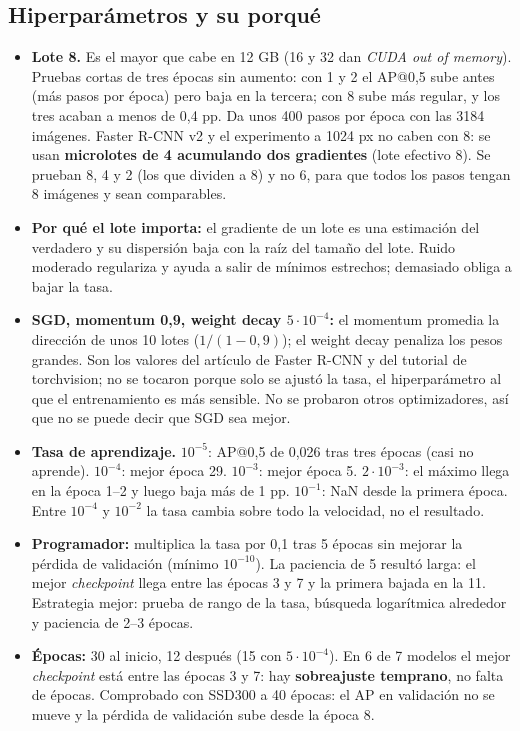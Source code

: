 \documentclass[11pt,a4paper]{article}
\begin{document}
\subsection{Hiperparámetros y su porqué}
\begin{itemize}
  \item \textbf{Lote 8.} Es el mayor que cabe en 12 GB (16 y 32 dan \emph{CUDA out of memory}). Pruebas cortas de tres épocas sin aumento: con 1 y 2 el AP@0,5 sube antes (más pasos por época) pero baja en la tercera; con 8 sube más regular, y los tres acaban a menos de 0,4 pp. Da unos 400 pasos por época con las 3184 imágenes. Faster R-CNN v2 y el experimento a 1024 px no caben con 8: se usan \textbf{microlotes de 4 acumulando dos gradientes} (lote efectivo 8). Se prueban 8, 4 y 2 (los que dividen a 8) y no 6, para que todos los pasos tengan 8 imágenes y sean comparables.
  \item \textbf{Por qué el lote importa:} el gradiente de un lote es una estimación del verdadero y su dispersión baja con la raíz del tamaño del lote. Ruido moderado regulariza y ayuda a salir de mínimos estrechos; demasiado obliga a bajar la tasa.
  \item \textbf{SGD, momentum 0,9, weight decay $5\cdot10^{-4}$:} el momentum promedia la dirección de unos 10 lotes ($1/(1-0{,}9)$); el weight decay penaliza los pesos grandes. Son los valores del artículo de Faster R-CNN y del tutorial de torchvision; no se tocaron porque solo se ajustó la tasa, el hiperparámetro al que el entrenamiento es más sensible. No se probaron otros optimizadores, así que no se puede decir que SGD sea mejor.
  \item \textbf{Tasa de aprendizaje.} $10^{-5}$: AP@0,5 de 0,026 tras tres épocas (casi no aprende). $10^{-4}$: mejor época 29. $10^{-3}$: mejor época 5. $2\cdot10^{-3}$: el máximo llega en la época 1--2 y luego baja más de 1 pp. $10^{-1}$: NaN desde la primera época. Entre $10^{-4}$ y $10^{-2}$ la tasa cambia sobre todo la velocidad, no el resultado.
  \item \textbf{Programador:} multiplica la tasa por 0,1 tras 5 épocas sin mejorar la pérdida de validación (mínimo $10^{-10}$). La paciencia de 5 resultó larga: el mejor \emph{checkpoint} llega entre las épocas 3 y 7 y la primera bajada en la 11. Estrategia mejor: prueba de rango de la tasa, búsqueda logarítmica alrededor y paciencia de 2--3 épocas.
  \item \textbf{Épocas:} 30 al inicio, 12 después (15 con $5\cdot10^{-4}$). En 6 de 7 modelos el mejor \emph{checkpoint} está entre las épocas 3 y 7: hay \textbf{sobreajuste temprano}, no falta de épocas. Comprobado con SSD300 a 40 épocas: el AP en validación no se mueve y la pérdida de validación sube desde la época 8.
\end{itemize}
\end{document}
